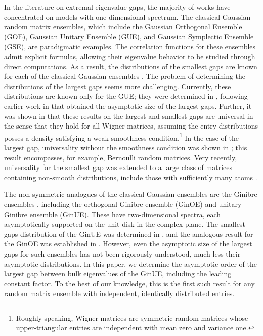 \documentclass{amsart}
\theoremstyle{plain}
\theoremstyle{definition}
\theoremstyle{remark}
\begin{document}
In the literature on extremal eigenvalue gaps, the majority of works have concentrated on models with one-dimensional spectrum. The classical Gaussian random matrix ensembles, which include the Gaussian Orthogonal Ensemble (GOE), Gaussian Unitary Ensemble (GUE), and Gaussian Symplectic Ensemble (GSE), are paradigmatic 
examples. 
The correlation functions for these ensembles admit explicit formulas, allowing their eigenvalue behavior to be studied through direct computations. As a result, the distributions of the smallest gaps are known for each of the classical Gaussian ensembles \cite{vinson2001closest,ben2013extreme,feng2019small,feng2024small}. The problem of determining the distributions of the largest gaps seems more challenging. Currently, these distributions are known only for the GUE; they were determined in \cite{feng2018large}, following earlier work in \cite{ben2013extreme} that obtained the asymptotic size of the largest gaps. Further, it was shown in \cite{bourgade2021extreme} that these results on the largest and smallest gaps are universal in the sense that they hold for all Wigner matrices, assuming the entry distributions posses a density satisfying a weak smoothness condition.\footnote{Roughly speaking, Wigner matrices are symmetric random matrices whose upper-triangular entries are independent with mean zero and variance one.}
In the case of the largest gap, universality without the smoothness condition was shown in \cite{landon2020comparison}; this result encompasses, for example, Bernoulli random matrices. 
Very recently, universality for the smallest gap was extended to a large class of matrices containing non-smooth distributions, include those with sufficiently many atoms \cite{zhang2025quantitative}.

The non-symmetric analogues of the classical Gaussian ensembles are the Ginibre ensembles \cite{ginibre1965statistical,byun2024progress}, including the orthogonal Ginibre ensemble (GinOE) and unitary Ginibre ensemble (GinUE). These have two-dimensional spectra, each asymptotically supported on the unit disk in the complex plane.
The smallest gaps distribution of the GinUE was determined in \cite{shi2012smallest}, and the analogous result for the GinOE was established in \cite{lopatto2024smallest}. However, even the asymptotic size of the largest gaps for such ensembles has not been rigorously understood, much less their asymptotic distributions. In this paper, we determine the asymptotic order of the largest gap between bulk eigenvalues of the GinUE, including the leading constant factor.  To the best of our knowledge, this is the first such result for any random matrix ensemble with independent, identically distributed entries. 
\end{document}
